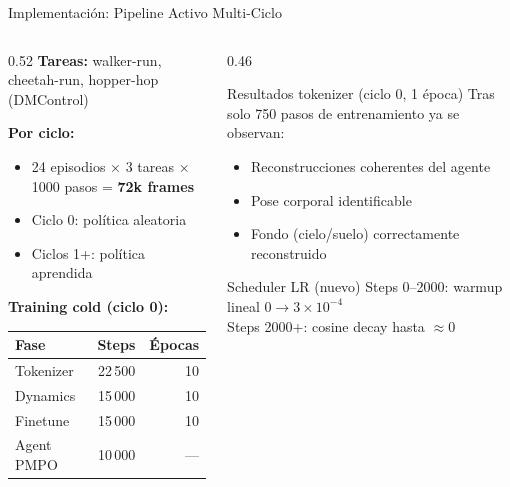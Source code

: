 \documentclass[aspectratio=169, 12pt]{beamer}
\begin{document}
\begin{frame}{Implementación: Pipeline Activo Multi-Ciclo}
\begin{columns}[T]
  \begin{column}{0.52\textwidth}
    \textbf{Tareas:} walker-run, cheetah-run, hopper-hop (DMControl)

    \vspace{6pt}
    \textbf{Por ciclo:}
    \begin{itemize}
      \item 24 episodios × 3 tareas × 1000 pasos = \textbf{72k frames}
      \item Ciclo 0: política aleatoria
      \item Ciclos 1+: política aprendida
    \end{itemize}

    \vspace{6pt}
    \textbf{Training cold (ciclo 0):}
    \begin{tabular}{lrr}
      \toprule
      Fase & Steps & Épocas \\
      \midrule
      Tokenizer  & 22\,500 & 10 \\
      Dynamics   & 15\,000 & 10 \\
      Finetune   & 15\,000 & 10 \\
      Agent PMPO & 10\,000 & --- \\
      \bottomrule
    \end{tabular}
  \end{column}
  \begin{column}{0.46\textwidth}
    \begin{exampleblock}{Resultados tokenizer (ciclo 0, 1 época)}
      Tras solo 750 pasos de entrenamiento ya se observan:
      \begin{itemize}\small
        \item Reconstrucciones coherentes del agente
        \item Pose corporal identificable
        \item Fondo (cielo/suelo) correctamente reconstruido
      \end{itemize}
    \end{exampleblock}

    \vspace{6pt}
    \begin{block}{Scheduler LR (nuevo)}
      \small
      Steps 0--2000: warmup lineal $0 \to 3{\times}10^{-4}$\\
      Steps 2000+: cosine decay hasta $\approx 0$
    \end{block}
  \end{column}
\end{columns}
\end{frame}
\end{document}
